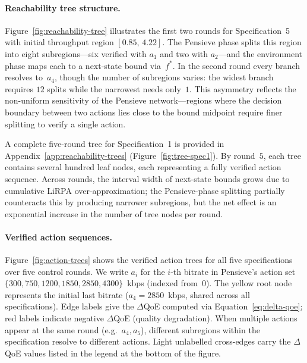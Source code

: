 \documentclass[thesis]{uofithesis} %
\begin{document}
    \paragraph{Reachability tree structure.}
    Figure~\ref{fig:reachability-tree} illustrates the first two rounds
    for Specification~5 with initial throughput region
    $[0.85,\, 4.22]$.  The Pensieve phase splits this region into eight
    subregions---six verified with $a_1$ and two with $a_2$---and the
    environment phase maps each to a next-state bound via~$f^{\ast}$.
    In the second round every branch resolves to~$a_4$, though the
    number of subregions varies: the widest branch requires $12$ splits
    while the narrowest needs only~$1$.  This asymmetry reflects the
    non-uniform sensitivity of the Pensieve network---regions where the
    decision boundary between two actions lies close to the bound
    midpoint require finer splitting to verify a single action.

    A complete five-round tree for Specification~1 is provided in
    Appendix~\ref{app:reachability-trees} (Figure~\ref{fig:tree-spec1}).
    By round~$5$, each tree contains several hundred leaf nodes, each
    representing a fully verified action sequence.
    Across rounds, the interval width of next-state bounds grows due to
    cumulative LiRPA over-approximation; the Pensieve-phase splitting
    partially counteracts this by producing narrower subregions, but
    the net effect is an exponential increase in the number of tree
    nodes per round.

    \paragraph{Verified action sequences.}
    Figure~\ref{fig:action-trees} shows the verified action trees
    for all five specifications over five control rounds.
    We write $a_i$ for the $i$-th bitrate in Pensieve's action set
    $\{300, 750, 1200, 1850, 2850, 4300\}$~kbps (indexed from~$0$).
    The yellow root node represents the initial last bitrate
    ($a_4 = 2850$~kbps, shared across all specifications).
    Edge labels give the $\Delta$QoE computed via
    Equation~\eqref{eq:delta-qoe}; red labels indicate negative $\Delta$QoE
    (quality degradation).  When multiple actions appear at the same
    round (e.g.\ $a_4, a_5$), different subregions within the
    specification resolve to different actions.
    Light unlabelled cross-edges carry the $\Delta$QoE values listed in the
    legend at the bottom of the figure.
\end{document}
